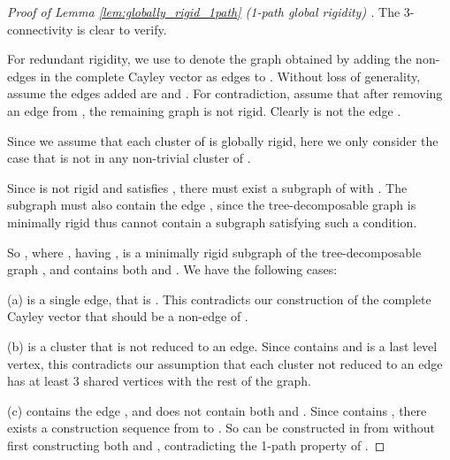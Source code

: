 \documentclass[secthm,amsthm,english]{article}
\theoremstyle{definition}
\theoremstyle{remark}
\begin{document}
\begin{proof}[Proof of Lemma \ref{lem:globally_rigid_1path} (1-path global rigidity) ]
The 3-connectivity is clear to verify.

For redundant rigidity, we use  to denote the graph obtained by adding the non-edges
in  the complete Cayley vector as edges to . 
Without loss of generality, assume the edges added are  and .
For contradiction, assume that after removing an edge  from , 
the remaining graph  is not rigid. 
Clearly  is not the edge .

Since we assume that each cluster of  is globally rigid, here we only consider the case that
 is not in any non-trivial cluster of . 

Since  is not rigid and  satisfies , 
there must exist a subgraph  of 
with . 
The subgraph  must also contain the edge , 
since the tree-decomposable graph  is minimally rigid thus cannot contain a subgraph satisfying such a condition. 

So , where , having ,
is a minimally rigid subgraph of the tree-decomposable graph , 
and contains both  and . 
We have the following cases:

\noindent (a)  is a single edge, that is . 
This contradicts our construction of the complete Cayley vector that  should be a non-edge of . 

\noindent (b)  is a cluster that is not reduced to an edge.  
Since  contains  and  is a last level vertex, 
this contradicts our assumption that each cluster not reduced to an edge
has at least 3 shared vertices with the rest of the graph.

\noindent (c)  contains the edge , and does not contain both  and . 
Since  contains ,  there exists a construction sequence from  to . 
So  can be constructed in  from  without first constructing both  and , 
contradicting the 1-path property of .
\end{proof}
\end{document}
